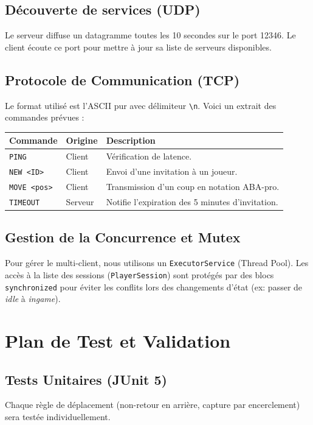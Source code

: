 \documentclass[10pt]{article} %
\begin{document}
\subsection{Découverte de services (UDP)}
Le serveur diffuse un datagramme toutes les 10 secondes sur le port 12346. Le client écoute ce port pour mettre à jour sa liste de serveurs disponibles.

\subsection{Protocole de Communication (TCP)}
Le format utilisé est l'ASCII pur avec délimiteur \texttt{\textbackslash n}. Voici un extrait des commandes prévues :
\begin{center}
\begin{tabular}{llp{6cm}}
\toprule
Commande & Origine & Description \\
\midrule
\texttt{PING} & Client & Vérification de latence. \\
\texttt{NEW <ID>} & Client & Envoi d'une invitation à un joueur. \\
\texttt{MOVE <pos>} & Client & Transmission d'un coup en notation ABA-pro. \\
\texttt{TIMEOUT} & Serveur & Notifie l'expiration des 5 minutes d'invitation. \\
\bottomrule
\end{tabular}
\end{center}

\subsection{Gestion de la Concurrence et Mutex}
Pour gérer le multi-client, nous utilisons un \texttt{ExecutorService} (Thread Pool). Les accès à la liste des sessions (\texttt{PlayerSession}) sont protégés par des blocs \texttt{synchronized} pour éviter les conflits lors des changements d'état (ex: passer de \textit{idle} à \textit{ingame}).



\section{Plan de Test et Validation}
\subsection{Tests Unitaires (JUnit 5)}
Chaque règle de déplacement (non-retour en arrière, capture par encerclement) sera testée individuellement.
\end{document}
